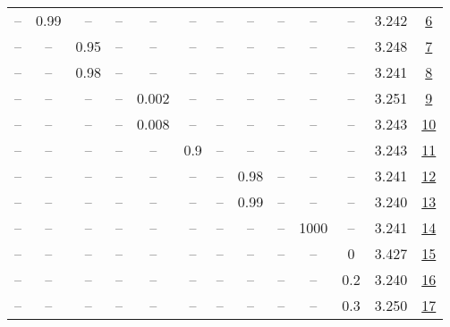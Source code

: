 \begin{table}[H]
\begin{tabular}{ccccccccccccc}
-- & 0.99 & -- & -- & -- & -- & -- & -- & -- & -- & -- & 3.242 & \href{https://wandb.ai/stanford-mercury/optimizer-scaling/runs/sweep-130m-21B-mudamvbcec8dlr0.004-alr0.004-wd0.1-minlr0-warmup5-21c38c}{6} \\
-- & -- & 0.95 & -- & -- & -- & -- & -- & -- & -- & -- & 3.248 & \href{https://wandb.ai/stanford-mercury/optimizer-scaling/runs/sweep-130m-21B-mudamv4d53eelr0.004-alr0.004-wd0.1-minlr0-warmup5-df4517}{7} \\
-- & -- & 0.98 & -- & -- & -- & -- & -- & -- & -- & -- & 3.241 & \href{https://wandb.ai/stanford-mercury/optimizer-scaling/runs/sweep-130m-21B-mudamv4a02balr0.004-alr0.004-wd0.1-minlr0-warmup5-342538}{8} \\
-- & -- & -- & -- & 0.002 & -- & -- & -- & -- & -- & -- & 3.251 & \href{https://wandb.ai/stanford-mercury/optimizer-scaling/runs/sweep-130m-21B-mudamv1879fblr0.002-alr0.004-wd0.1-minlr0-warmup5-8adb03}{9} \\
-- & -- & -- & -- & 0.008 & -- & -- & -- & -- & -- & -- & 3.243 & \href{https://wandb.ai/stanford-mercury/optimizer-scaling/runs/sweep-130m-21B-mudamvef4176lr0.008-alr0.004-wd0.1-minlr0-warmup5-e23d39}{10} \\
-- & -- & -- & -- & -- & 0.9 & -- & -- & -- & -- & -- & 3.243 & \href{https://wandb.ai/stanford-mercury/optimizer-scaling/runs/sweep-130m-21B-mudamvc4d759lr0.004-alr0.004-wd0.1-minlr0-warmup5-efbc12}{11} \\
-- & -- & -- & -- & -- & -- & -- & 0.98 & -- & -- & -- & 3.241 & \href{https://wandb.ai/stanford-mercury/optimizer-scaling/runs/sweep-130m-21B-mudamv628ceflr0.004-alr0.004-wd0.1-minlr0-warmup5-c65cf8}{12} \\
-- & -- & -- & -- & -- & -- & -- & 0.99 & -- & -- & -- & 3.240 & \href{https://wandb.ai/stanford-mercury/optimizer-scaling/runs/sweep-130m-21B-mudamv1f7123lr0.004-alr0.004-wd0.1-minlr0-warmup5-e84f38}{13} \\
-- & -- & -- & -- & -- & -- & -- & -- & -- & 1000 & -- & 3.241 & \href{https://wandb.ai/stanford-mercury/optimizer-scaling/runs/sweep-130m-21B-mudamv47da80lr0.004-alr0.004-wd0.1-minlr0-warmup1-a616b0}{14} \\
-- & -- & -- & -- & -- & -- & -- & -- & -- & -- & 0 & 3.427 & \href{https://wandb.ai/stanford-mercury/optimizer-scaling/runs/sweep-130m-21B-mudamk66cc82lr0.004-alr0.004-wd0-minlr0-warmup500-12e466}{15} \\
-- & -- & -- & -- & -- & -- & -- & -- & -- & -- & 0.2 & 3.240 & \href{https://wandb.ai/stanford-mercury/optimizer-scaling/runs/sweep-130m-21B-mudamk117648lr0.004-alr0.004-wd0.2-minlr0-warmup5-a63661}{16} \\
-- & -- & -- & -- & -- & -- & -- & -- & -- & -- & 0.3 & 3.250 & \href{https://wandb.ai/stanford-mercury/optimizer-scaling/runs/sweep-130m-21B-mudamk32cfe1lr0.004-alr0.004-wd0.3-minlr0-warmup5-6bc863}{17} \\
\bottomrule
\end{tabular}
\end{table}

